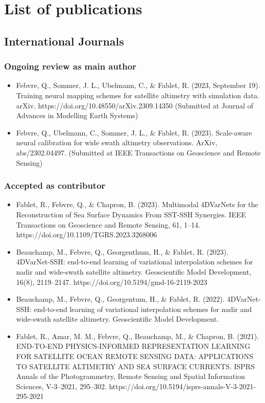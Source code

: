 
\chapter*{List of publications}

\section*{International Journals}
\subsection*{Ongoing review as main author}
\begin{itemize}
    \item Febvre, Q., Sommer, J. L., Ubelmann, C., \& Fablet, R. (2023, September 19). Training neural mapping schemes for satellite altimetry with simulation data. arXiv. https://doi.org/10.48550/arXiv.2309.14350 (Submitted at Journal of Advances in Modelling Earth Systems) 
    \item Febvre, Q., Ubelmann, C., Sommer, J. L., \& Fablet, R. (2023). Scale-aware neural calibration for wide swath altimetry observations. ArXiv, abs/2302.04497. (Submitted at IEEE Transactions on Geoscience and Remote Sensing) 
\end{itemize}

\subsection*{Accepted as contributor}
\begin{itemize}
    \item Fablet, R., Febvre, Q., \& Chapron, B. (2023). Multimodal 4DVarNets for the Reconstruction of Sea Surface Dynamics From SST-SSH Synergies. IEEE Transactions on Geoscience and Remote Sensing, 61, 1–14. https://doi.org/10.1109/TGRS.2023.3268006
    \item Beauchamp, M., Febvre, Q., Georgenthum, H., \& Fablet, R. (2023). 4DVarNet-SSH: end-to-end learning of variational interpolation schemes for nadir and wide-swath satellite altimetry. Geoscientific Model Development, 16(8), 2119–2147. https://doi.org/10.5194/gmd-16-2119-2023
    \item Beauchamp, M., Febvre, Q., Georgentum, H., \& Fablet, R. (2022). 4DVarNet-SSH: end-to-end learning of variational interpolation schemes for nadir and wide-swath satellite altimetry. Geoscientific Model Development.
    \item Fablet, R., Amar, M. M., Febvre, Q., Beauchamp, M., \& Chapron, B. (2021). END-TO-END PHYSICS-INFORMED REPRESENTATION LEARNING FOR SATELLITE OCEAN REMOTE SENSING DATA: APPLICATIONS TO SATELLITE ALTIMETRY AND SEA SURFACE CURRENTS. ISPRS Annals of the Photogrammetry, Remote Sensing and Spatial Information Sciences, V-3–2021, 295–302. https://doi.org/10.5194/isprs-annals-V-3-2021-295-2021
\end{itemize}

